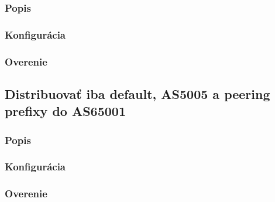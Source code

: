 \documentclass[12pt,twoside,a4paper]{report}
\begin{document}
\subsubsection{Popis}
\paragraph{}

\subsubsection{Konfigurácia}
\paragraph{}

\subsubsection{Overenie}
\paragraph{}







\subsection{Distribuovať iba default, AS5005 a peering prefixy do AS65001}
\subsubsection{Popis}
\paragraph{}

\subsubsection{Konfigurácia}
\paragraph{}

\subsubsection{Overenie}
\paragraph{}
\end{document}
